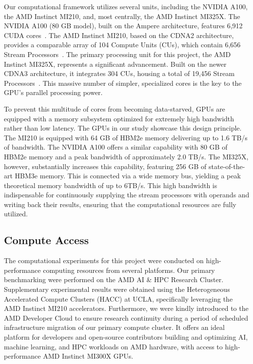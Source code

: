 \documentclass[twoside,12pt,openright]{report}  %
\begin{document}
Our computational framework utilizes several units, including the NVIDIA A100, the AMD Instinct MI210, and, most centrally, the AMD Instinct MI325X. The NVIDIA A100 (80 GB model), built on the Ampere architecture, features 6,912 CUDA cores~\cite{nvidia:a100}. The AMD Instinct MI210, based on the CDNA2 architecture, provides a comparable array of 104 Compute Units (CUs), which contain 6,656 Stream Processors~\cite{amd:mi210}. The primary processing unit for this project, the AMD Instinct MI325X, represents a significant advancement. Built on the newer CDNA3 architecture, it integrates 304 CUs, housing a total of 19,456 Stream Processors~\cite{amd:mi325x}. This massive number of simpler, specialized cores is the key to the GPU's parallel processing power.


To prevent this multitude of cores from becoming data-starved, GPUs are equipped with a memory subsystem optimized for extremely high bandwidth rather than low latency. The GPUs in our study showcase this design principle. The MI210 is equipped with 64 GB of HBM2e memory delivering up to 1.6 TB/s of bandwidth. The NVIDIA A100 offers a similar capability with 80 GB of HBM2e memory and a peak bandwidth of approximately 2.0 TB/s. The MI325X, however, substantially increases this capability, featuring 256 GB of state-of-the-art HBM3e memory. This is connected via a wide memory bus, yielding a peak theoretical memory bandwidth of up to 6TB/s. This high bandwidth is indispensable for continuously supplying the stream processors with operands and writing back their results, ensuring that the computational resources are fully utilized.
\subsection{Compute Access}
The computational experiments for this project were conducted on high-performance computing resources from several platforms. Our primary benchmarking were performed on the AMD AI \& HPC Research Cluster. Supplementary experimental results were obtained using the Heterogeneous Accelerated Compute Clusters (HACC) at UCLA, specifically leveraging the AMD Instinct MI210 accelerators. Furthermore, we were kindly introduced to the AMD Developer Cloud to ensure research continuity during a period of scheduled infrastructure migration of our primary compute cluster. It offers an ideal platform for developers and open-source contributors building and optimizing AI, machine learning, and HPC workloads on AMD hardware, with access to high-performance AMD Instinct MI300X GPUs.
\end{document}
